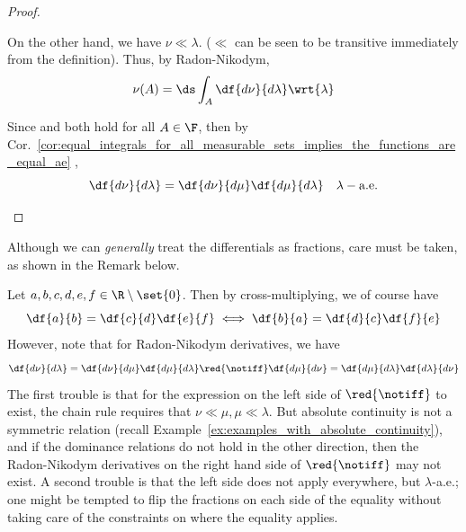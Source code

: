 \documentclass{article} %
\begin{document}
\begin{proof}
\begin{alphabate}
On the other hand, we have $\nu \ll \lambda$. ($\ll$ can be seen to be transitive immediately from the definition).  Thus, by Radon-Nikodym, 
\begin{align}
\nu(A) = \ds\int_A \df{d\nu}{d\lambda} \wrt{\lambda}
\label{eqn:RN_chain_rule_LHS}	
\end{align}

Since   and  both hold for all $A \in \F$, then by Cor.~\ref{cor:equal_integrals_for_all_measurable_sets_implies_the_functions_are_equal_ae} , 
\[ \df{d\nu}{d\lambda} = \df{d\nu}{d\mu}  \df{d\mu}{d\lambda} \quad \lambda-\text{a.e.} \]	

\end{alphabate}
	
\end{proof}



Although we can \textit{generally} treat the differentials as fractions, care must be taken, as shown in the Remark below. 

\begin{remark}{}
Let $a,b,c,d,e,f \in \R \setminus \set{0}$. Then by cross-multiplying, we of course have
\[ \df{a}{b} = \df{c}{d} \df{e}{f} \iff \df{b}{a} = \df{d}{c} \df{f}{e} \]
However, note that for Radon-Nikodym derivatives, we have 
\[ \df{d\nu}{d\lambda} = \df{d\nu}{d\mu}  \df{d\mu}{d\lambda}   \red{\notiff} \df{d\mu}{d\nu} = \df{d\mu}{d\lambda}  \df{d\lambda}{d\nu} \]
The first trouble is that for the expression on the left side of $\red{\notiff}$ to exist, the chain rule  requires that $\nu \ll \mu, \mu \ll \lambda$.  But absolute continuity is not a symmetric relation (recall Example~\ref{ex:examples_with_absolute_continuity}), and if the dominance relations do not hold in the other direction, then the Radon-Nikodym derivatives on the right hand side of $\red{\notiff}$ may not exist.   A second trouble is that the left side does not apply everywhere, but $\lambda$-a.e.; one might be tempted to flip the fractions on each side of the equality without taking care of the constraints on where the equality applies.
\end{remark}
\end{document}
